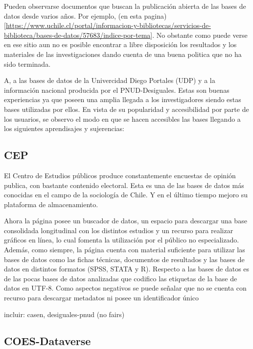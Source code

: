 \documentclass[
  14pt,
]{book}
\begin{document}
Pueden observarse documentos que buscan la publicación abierta de las bases de datos desde varios años. Por ejemplo, (en esta pagina){[}\url{https://www.uchile.cl/portal/informacion-y-bibliotecas/servicios-de-biblioteca/bases-de-datos/57683/indice-por-tema}{]}. No obstante como puede verse en ese sitio aun no es posible encontrar a libre disposición los resultados y los materiales de las investigaciones dando cuenta de una buena politica que no ha sido terminada.

A, a las bases de datos de la Univercidad Diego Portales (UDP) y a la información nacional producida por el PNUD-Desiguales. Estas son buenas experiencias ya que poseen una amplia llegada a los investigadores siendo estas bases utilizadas por ellos. En vista de su popularidad y accesibilidad por parte de los usuarios, se observo el modo en que se hacen accesibles las bases llegando a los siguientes aprendisajes y sujerencias:

\hypertarget{cep}{%
\subsection{CEP}\label{cep}}

El Centro de Estudios públicos produce constantemente encuestas de opinión publica, con bastante contenido electoral. Esta es una de las bases de datos más conocidas en el campo de la sociología de Chile. Y en el último tiempo mejoro su plataforma de almacenamiento.

Ahora la página posee un buscador de datos, un espacio para descargar una base consolidada longitudinal con los distintos estudios y un recurso para realizar gráficos en línea, lo cual fomenta la utilización por el público no especializado. Además, como siempre, la página cuenta con material suficiente para utilizar las bases de datos como las fichas técnicas, documentos de resultados y las bases de datos en distintos formatos (SPSS, STATA y R). Respecto a las bases de datos es de las pocas bases de datos analizadas que codifico las etiquetas de la base de datos en UTF-8. Como aspectos negativos se puede señalar que no se cuenta con recurso para descargar metadatos ni posee un identificador único

incluir: casen, desiguales-pnud (no fairs)

\hypertarget{coes-dataverse}{%
\subsection{COES-Dataverse}\label{coes-dataverse}}
\end{document}
